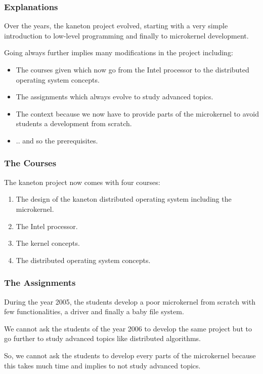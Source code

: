
\begin{frame}
  \frametitle{Explanations}

  Over the years, the kaneton project evolved, starting with a very
  simple introduction to low-level programming and finally
  to microkernel development.

  \nl

  Going always further implies many modifications in the project
  including:

  \begin{itemize}[<+->]
    \item
      The courses given which now go from the Intel processor to
      the distributed operating system concepts.
    \item
      The assignments which always evolve to study advanced topics.
    \item
      The context because we now have to provide parts of the microkernel
      to avoid students a development from scratch.
    \item
      .. and so the prerequisites.
  \end{itemize}
\end{frame}


\begin{frame}
  \frametitle{The Courses}

  The kaneton project now comes with four courses:

  \begin{enumerate}
    \item
      The design of the kaneton distributed operating system including
      the microkernel.
    \item
      The Intel processor.
    \item
      The kernel concepts.
    \item
      The distributed operating system concepts.
  \end{enumerate}
\end{frame}


\begin{frame}
  \frametitle{The Assignments}

  During the year 2005, the students develop a poor microkernel
  from scratch with few functionalities, a driver and finally a baby
  file system.

  \nl

  We cannot ask the students of the year 2006 to develop the same project
  but to go further to study advanced topics like distributed algorithms.

  \nl

  So, we cannot ask the students to develop every parts of the microkernel
  because this takes much time and implies to not study advanced
  topics.
\end{frame}


